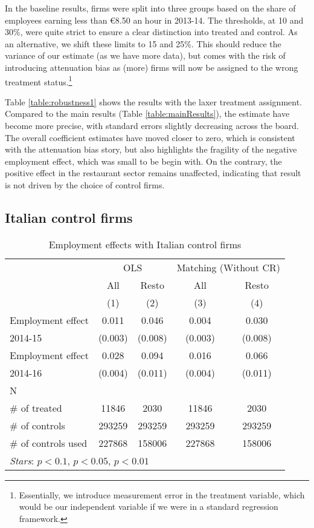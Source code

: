 In the baseline results, firms were split into three groups based on the share of employees earning less than €8.50 an hour in 2013-14. The thresholds, at 10 and 30\%, were quite strict to ensure a clear distinction into treated and control. As an alternative, we shift these limits to 15 and 25\%. This should reduce the variance of our estimate (as we have more data), but comes with the risk of introducing attenuation bias as (more) firms will now be assigned to the wrong treatment status.\footnote{Essentially, we introduce measurement error in the treatment variable, which would be our independent variable if we were in a standard regression framework.}

Table \ref{table:robustness1} shows the results with the laxer treatment assignment. Compared to the main results (Table \ref{table:mainResults}), the estimate have become more precise, with standard errors slightly decreasing across the board. The overall coefficient estimates have moved closer to zero, which is consistent with the attenuation bias story, but also highlights the fragility of the negative employment effect, which was small to be begin with. On the contrary, the positive effect in the restaurant sector remains unaffected, indicating that result is not driven by the choice of control firms.

\subsection{Italian control firms}\label{sec:italy}
\begin{table}[htbp]\centering
\caption{Employment effects with Italian control firms}\label{table:robustness2}
\begin{tabular}{l|*{2}{c}|*{2}{c}}
\toprule
&\multicolumn{2}{c|}{OLS}&\multicolumn{2}{c}{Matching (Without CR)}\\
&All & Resto &All & Resto \\
&(1)&(2)&(3)&(4)\\
\midrule
Employment effect & 0.011 & 0.046 & 0.004 & 0.030   \\
2014-15 & (0.003)\sym{***} & (0.008)\sym{***} & (0.003) & (0.008)\sym{***} \\
Employment effect & 0.028 & 0.094 & 0.016 & 0.066   \\
2014-16 & (0.004)\sym{***} & (0.011)\sym{***} & (0.004)\sym{***} & (0.011)\sym{***} \\
\midrule
N&&&&\\
\# of treated & 11846 & 2030  & 11846 & 2030     \\
\# of controls & 293259 & 293259  & 293259 & 293259    \\
\# of controls used & 227868 & 158006  & 227868 & 158006       \\
\bottomrule
\multicolumn{5}{p{0.7\textwidth}}{\emph{Stars}: \sym{*} \(p<0.1\), \sym{**} \(p<0.05\), \sym{***} \(p<0.01\)}\\
\end{tabular}
\end{table}

